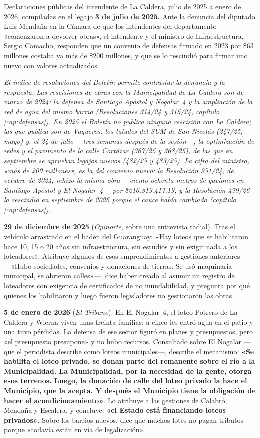\begin{ficha}{Declaraciones públicas del intendente de La Caldera, julio de 2025 a enero de 2026, compiladas en el legajo}
\textbf{3 de julio de 2025.} Ante la denuncia del diputado Luis Mendaña en la Cámara de que los intendentes del departamento «comenzaron a devolver obras», el intendente y el ministro de Infraestructura, Sergio Camacho, responden que un convenio de defensas firmado en 2023 por \$63 millones costaba ya más de \$200 millones, y que se lo rescindió para firmar uno nuevo con valores actualizados.

\textit{El índice de resoluciones del Boletín permite contrastar la denuncia y la respuesta. Las rescisiones de obras con la Municipalidad de La Caldera son de marzo de 2024: la defensa de Santiago Apóstol y Nogalar~4 y la ampliación de la red de agua del mismo barrio (Resoluciones 314/24 y 315/24, capítulo \ref{cap:defensas}). En 2025 el Boletín no publica ninguna rescisión con La Caldera; las que publica son de Vaqueros: los taludes del SUM de San Nicolás (247/25, mayo) y, el 24 de julio ---tres semanas después de la sesión---, la optimización de redes y el pavimento de la calle Cortázar (367/25 y 368/25), de las que en septiembre se aprueban legajos nuevos (482/25 y 483/25). La cifra del ministro, «más de 200 millones», es la del convenio nuevo: la Resolución 951/24, de octubre de 2024, rehízo la misma obra ---ciento ochenta metros de gaviones en Santiago Apóstol y El Nogalar~4--- por \$216.819.417,19, y la Resolución 479/26 la rescindió en septiembre de 2026 porque el cauce había cambiado (capítulo \ref{cap:defensas}).}

\textbf{29 de diciembre de 2025} (\textit{Opinorte}, sobre una entrevista radial). Tras el vehículo arrastrado en el badén del Guaranguay: «Hay loteos que se habilitaron hace 10, 15 o 20 años sin infraestructura, sin estudios y sin exigir nada a los loteadores». Atribuye algunos de esos emprendimientos a gestiones anteriores ---«Hubo sociedades, convenios y donaciones de tierras. Se usó maquinaria municipal, se abrieron calles»---, dice haber creado al asumir un registro de loteadores con exigencia de certificados de no inundabilidad, y pregunta por qué quienes los habilitaron y luego fueron legisladores no gestionaron las obras.

\textbf{5 de enero de 2026} (\textit{El Tribuno}). En El Nogalar~4, el loteo Potrero de La Caldera y Wierna viven unas treinta familias; a cinco les entró agua en el patio y una tuvo pérdidas. La defensa de ese sector figuró en planes y presupuestos, pero «el presupuesto presupone» y no hubo recursos. Consultado sobre El Nogalar ---que el periodista describe como loteos municipales---, describe el mecanismo: \textbf{«Se habilita el loteo privado, se donan parte del remanente sobre el río a la Municipalidad. La Municipalidad, por la necesidad de la gente, otorga esos terrenos. Luego, la donación de calle del loteo privado la hace el Municipio, que la acepta. Y después el Municipio tiene la obligación de hacer el acondicionamiento»}. Lo atribuye a las gestiones de Calabró, Mendaña y Escalera, y concluye: \textbf{«el Estado está financiando loteos privados»}. Sobre los barrios nuevos, dice que muchos lotes no pagan tributos porque «todavía están en vía de legalización».


\end{ficha}
